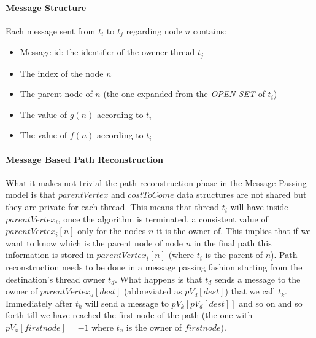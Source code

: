 \documentclass[twocolumn, switch]{article} %
\begin{document}
\paragraph{Message Structure} Each message sent from $t_i$ to $t_j$ regarding node $n$ contains:
\begin{itemize}
  \item Message id: the identifier of the owener thread $t_j$
  \item The index of the node $n$
  \item The parent node of $n$ (the one expanded from the \textit{OPEN SET} of $t_i$)
  \item The value of $g(n)$ according to $t_i$
  \item The value of $f(n)$ according to $t_i$
\end{itemize}
\paragraph{Message Based Path Reconstruction}
What it makes not trivial the path reconstruction phase in the Message Passing model
is that $parentVertex$ and $costToCome$ data structures are not shared but they are private
for each thread. This means that thread $t_i$ will have inside $parentVertex_i$, once the algorithm is terminated, 
a consistent value of $parentVertex_i[n]$ only for the nodes $n$ it is the owner of. This implies that if
we want to know which is the parent node of node $n$ in the final path this information
is stored in $parentVertex_i[n]$ (where $t_i$ is the parent of $n$). Path reconstruction needs to be done in a message passing fashion starting
from the destination's thread owner $t_d$. What happens is that $t_d$ sends a message to
the owner of $parentVertex_d[dest]$ (abbreviated as $pV_d[dest]$) that we call $t_k$. Immediately after $t_k$ will send a message
to $pV_k[pV_d[dest]]$ and so on and so forth till we have reached the first node of the path (the one with $pV_x[firstnode] = -1$ where
$t_x$ is the owner of $firstnode$).
\end{document}
